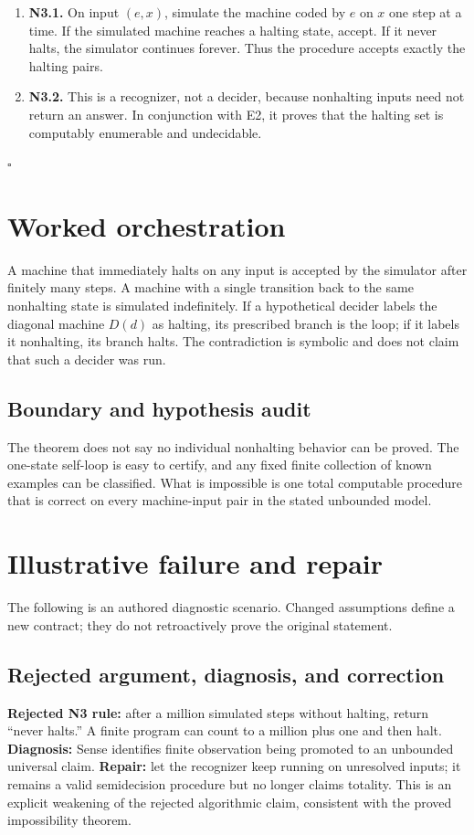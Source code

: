 \documentclass[preprint,12pt,aps,pra,showkeys,amsmath,amssymb,superscriptaddress,floatfix]{revtex4-2}
\theoremstyle{definition}
\theoremstyle{remark}
\begin{document}
\begin{enumerate}
\def\labelenumi{\arabic{enumi}.}
\item
  \textbf{N3.1.} On input \((e,x)\), simulate the machine coded by \(e\)
  on \(x\) one step at a time. If the simulated machine reaches a
  halting state, accept. If it never halts, the simulator continues
  forever. Thus the procedure accepts exactly the halting pairs.
\item
  \textbf{N3.2.} This is a recognizer, not a decider, because nonhalting
  inputs need not return an answer. In conjunction with E2, it proves
  that the halting set is computably enumerable and undecidable.
\end{enumerate}

\hfill$\square$

\section{Worked orchestration}

A machine that immediately halts on any input is accepted by the
simulator after finitely many steps. A machine with a single transition
back to the same nonhalting state is simulated indefinitely. If a
hypothetical decider labels the diagonal machine \(D(d)\) as halting,
its prescribed branch is the loop; if it labels it nonhalting, its
branch halts. The contradiction is symbolic and does not claim that such
a decider was run.

\subsection{Boundary and hypothesis audit}

The theorem does not say no individual nonhalting behavior can be
proved. The one-state self-loop is easy to certify, and any fixed finite
collection of known examples can be classified. What is impossible is
one total computable procedure that is correct on every machine-input
pair in the stated unbounded model.

\section{Illustrative failure and repair}

The following is an authored diagnostic scenario. Changed assumptions
define a new contract; they do not retroactively prove the original
statement.

\subsection{Rejected argument, diagnosis, and correction}
\textbf{Rejected N3 rule:} after a million simulated steps without
halting, return ``never halts.'' A finite program can count to a million
plus one and then halt. \textbf{Diagnosis:} Sense identifies finite
observation being promoted to an unbounded universal claim.
\textbf{Repair:} let the recognizer keep running on unresolved inputs;
it remains a valid semidecision procedure but no longer claims totality.
This is an explicit weakening of the rejected algorithmic claim,
consistent with the proved impossibility theorem.
\end{document}
